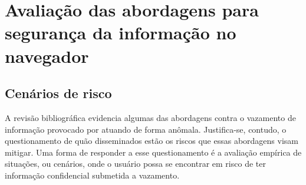 \section{Avaliação das abordagens para segurança da informação no navegador}

\subsection{Cenários de risco}
A revisão bibliográfica evidencia algumas das abordagens contra o vazamento de informação provocado por \scripts{} atuando de forma anômala. Justifica-se, contudo, o questionamento de quão disseminados estão os riscos que essas abordagens visam mitigar. Uma forma de responder a esse questionamento é a avaliação empírica de situações, ou cenários, onde o usuário possa se encontrar em risco de ter informação confidencial submetida a vazamento.

